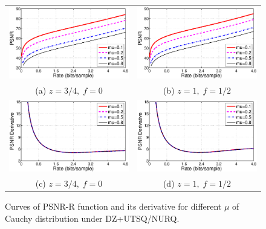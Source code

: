 \documentclass[smallabstract,smallcaptions]{dccpaper}
\begin{document}
\begin{figure}[tp]
\begin{center}
\begin{tabular}{cc}
\includegraphics[width = 0.5\linewidth]{Figures/section3/RD_Cauchy_z=0_75_p=0} &
\includegraphics[width = 0.5\linewidth]{Figures/section3/RD_Cauchy_z=1_p=0_5} \\
{\small (a) $z=3/4,\;f=0$} & {\small (b) $z=1,\;f=1/2$} \\
\includegraphics[width = 0.5\linewidth]{Figures/section3/RDDerivative_Cauchy_z=0_75_p=0} &
\includegraphics[width = 0.5\linewidth]{Figures/section3/RDDerivative_Cauchy_z=1_p=0_5} \\
{\small (c) $z=3/4,\;f=0$} & {\small (d) $z=1,\;f=1/2$}
\end{tabular}
\end{center}
\vspace{-20pt}
\caption{\label{fig:RD_mu}
Curves of PSNR-R function and its derivative for different $\mu$ of Cauchy distribution under DZ+UTSQ/NURQ.}
\end{figure}
\end{document}
